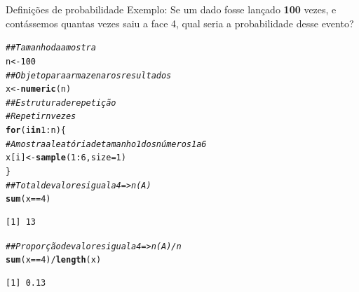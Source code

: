 \documentclass[10pt]{beamer}\usepackage[]{graphicx}\usepackage[]{color}
\makeatletter
\newcommand{\hlnum}[1]{\textcolor[rgb]{0.686,0.059,0.569}{#1}}%
\newcommand{\hlcom}[1]{\textcolor[rgb]{0.678,0.584,0.686}{\textit{#1}}}%
\newcommand{\hlopt}[1]{\textcolor[rgb]{0,0,0}{#1}}%
\newcommand{\hlstd}[1]{\textcolor[rgb]{0.345,0.345,0.345}{#1}}%
\newcommand{\hlkwa}[1]{\textcolor[rgb]{0.161,0.373,0.58}{\textbf{#1}}}%
\newcommand{\hlkwb}[1]{\textcolor[rgb]{0.69,0.353,0.396}{#1}}%
\newcommand{\hlkwc}[1]{\textcolor[rgb]{0.333,0.667,0.333}{#1}}%
\newcommand{\hlkwd}[1]{\textcolor[rgb]{0.737,0.353,0.396}{\textbf{#1}}}%
\newenvironment{kframe}{%
 \def\at@end@of@kframe{}%
 \ifinner\ifhmode%
  \def\at@end@of@kframe{\end{minipage}}%
  \begin{minipage}{\columnwidth}%
 \fi\fi%
 \def\FrameCommand##1{\hskip\@totalleftmargin \hskip-\fboxsep
 \colorbox{shadecolor}{##1}\hskip-\fboxsep
     \hskip-\linewidth \hskip-\@totalleftmargin \hskip\columnwidth}%
 \MakeFramed {\advance\hsize-\width
   \@totalleftmargin\z@ \linewidth\hsize
   \@setminipage}}%
 {\par\unskip\endMakeFramed%
 \at@end@of@kframe}
\newenvironment{knitrout}{}{} %
\theoremstyle{definition}
\makeatother
\begin{document}
\begin{frame}[fragile]{Definições de probabilidade}
  Exemplo: Se um dado fosse lançado \textbf{100} vezes, e contássemos
  quantas vezes saiu a face 4, qual seria a probabilidade desse evento?
\begin{knitrout}\footnotesize
{}\color{fgcolor}\begin{kframe}
\begin{alltt}
\hlcom{## Tamanho da amostra}
\hlstd{n} \hlkwb{<-} \hlnum{100}
\hlcom{## Objeto para armazenar os resultados}
\hlstd{x} \hlkwb{<-} \hlkwd{numeric}\hlstd{(n)}
\hlcom{## Estrutura de repetição}
\hlcom{# Repetir n vezes}
\hlkwa{for}\hlstd{(i} \hlkwa{in} \hlnum{1}\hlopt{:}\hlstd{n)\{}
    \hlcom{# Amostra aleatória de tamanho 1 dos números 1 a 6}
    \hlstd{x[i]} \hlkwb{<-} \hlkwd{sample}\hlstd{(}\hlnum{1}\hlopt{:}\hlnum{6}\hlstd{,} \hlkwc{size} \hlstd{=} \hlnum{1}\hlstd{)}
\hlstd{\}}
\hlcom{## Total de valores igual a 4 => n(A)}
\hlkwd{sum}\hlstd{(x} \hlopt{==} \hlnum{4}\hlstd{)}
\end{alltt}
\begin{verbatim}
[1] 13
\end{verbatim}
\begin{alltt}
\hlcom{## Proporção de valores igual a 4 => n(A)/n}
\hlkwd{sum}\hlstd{(x} \hlopt{==} \hlnum{4}\hlstd{)}\hlopt{/}\hlkwd{length}\hlstd{(x)}
\end{alltt}
\begin{verbatim}
[1] 0.13
\end{verbatim}
\end{kframe}
\end{knitrout}
\end{frame}
\end{document}
